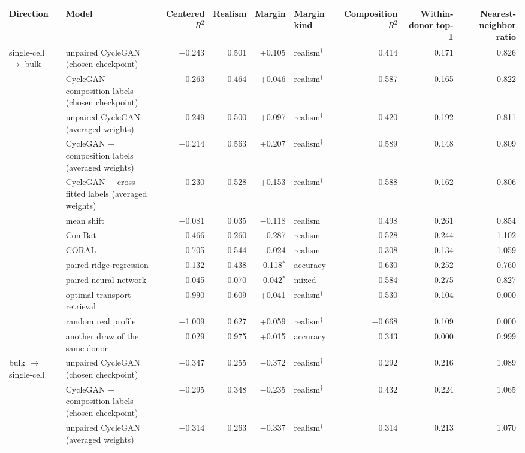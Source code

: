 \begin{table}[t]
\centering
\small
\begin{tabular}{llrrrlrrr}
\toprule
Direction & Model & Centered $R^2$ & Realism & Margin & Margin kind & Composition $R^2$ & Within-donor top-1 & Nearest-neighbor ratio \\
\midrule
single-cell $\to$ bulk & unpaired CycleGAN (chosen checkpoint) & $-$0.243 & 0.501 & +0.105 & realism$^{\dagger}$ & 0.414 & 0.171 & 0.826 \\
 & CycleGAN + composition labels (chosen checkpoint) & $-$0.263 & 0.464 & +0.046 & realism$^{\dagger}$ & 0.587 & 0.165 & 0.822 \\
 & unpaired CycleGAN (averaged weights) & $-$0.249 & 0.500 & +0.097 & realism$^{\dagger}$ & 0.420 & 0.192 & 0.811 \\
 & CycleGAN + composition labels (averaged weights) & $-$0.214 & 0.563 & +0.207 & realism$^{\dagger}$ & 0.589 & 0.148 & 0.809 \\
 & CycleGAN + cross-fitted labels (averaged weights) & $-$0.230 & 0.528 & +0.153 & realism$^{\dagger}$ & 0.588 & 0.162 & 0.806 \\
 & mean shift & $-$0.081 & 0.035 & $-$0.118 & realism & 0.498 & 0.261 & 0.854 \\
 & ComBat & $-$0.466 & 0.260 & $-$0.287 & realism & 0.528 & 0.244 & 1.102 \\
 & CORAL & $-$0.705 & 0.544 & $-$0.024 & realism & 0.308 & 0.134 & 1.059 \\
 & paired ridge regression & 0.132 & 0.438 & +0.118$^{*}$ & accuracy & 0.630 & 0.252 & 0.760 \\
 & paired neural network & 0.045 & 0.070 & +0.042$^{*}$ & mixed & 0.584 & 0.275 & 0.827 \\
 & optimal-transport retrieval & $-$0.990 & 0.609 & +0.041 & realism$^{\dagger}$ & $-$0.530 & 0.104 & 0.000 \\
 & random real profile & $-$1.009 & 0.627 & +0.059 & realism$^{\dagger}$ & $-$0.668 & 0.109 & 0.000 \\
 & another draw of the same donor & 0.029 & 0.975 & +0.015 & accuracy & 0.343 & 0.000 & 0.999 \\
bulk $\to$ single-cell & unpaired CycleGAN (chosen checkpoint) & $-$0.347 & 0.255 & $-$0.372 & realism$^{\dagger}$ & 0.292 & 0.216 & 1.089 \\
 & CycleGAN + composition labels (chosen checkpoint) & $-$0.295 & 0.348 & $-$0.235 & realism$^{\dagger}$ & 0.432 & 0.224 & 1.065 \\
 & unpaired CycleGAN (averaged weights) & $-$0.314 & 0.263 & $-$0.337 & realism$^{\dagger}$ & 0.314 & 0.213 & 1.070 \\

\end{tabular}
\end{table}
